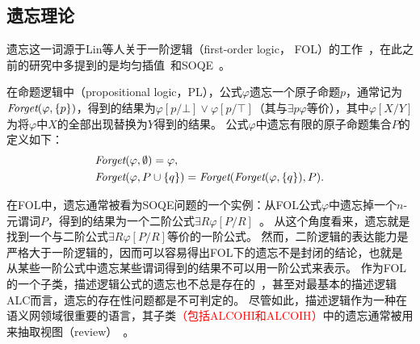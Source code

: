 \subsection{遗忘理论}\label{chapter01:forgetting}
遗忘这一词源于Lin等人关于一阶逻辑（first-order logic， FOL）的工作~\cite{lin1994forget}，在此之前的研究中多提到的是均匀插值~\cite{visser1996uniform,konev2009forgetting}和SOQE~\cite{ackermann1935untersuchungen}。

在命题逻辑中（propositional logic，PL），公式$\varphi$遗忘一个原子命题$p$，通常记为$\textit{Forget}(\varphi,\{p\})$，得到的结果为$\varphi[p/\bot] \vee \varphi[p/\top]$（其与$\exists p\varphi$等价），其中$\varphi[X/Y]$为将$\varphi$中$X$的全部出现替换为$Y$得到的结果。
公式$\varphi$中遗忘有限的原子命题集合$P$的定义如下：
\begin{alignat*}{2}
	&  \Forget(\varphi, \emptyset) = \varphi, \qquad \\ %
	&  \Forget(\varphi, P \cup \{q\})  = \Forget(\Forget(\varphi, \{q\}), P).
	\nonumber
\end{alignat*}

在FOL中，遗忘通常被看为SOQE问题的一个实例：从FOL公式$\varphi$中遗忘掉一个$n$-元谓词$P$，得到的结果为一个二阶公式$\exists R \varphi[P/R]$~\cite{lin1994forget}。
从这个角度看来，遗忘就是找到一个与二阶公式$\exists R \varphi[P/R]$等价的一阶公式。
然而，二阶逻辑的表达能力是严格大于一阶逻辑的，因而可以容易得出FOL下的遗忘不是封闭的结论，也就是从某些一阶公式中遗忘某些谓词得到的结果不可以用一阶公式来表示。
作为FOL的一个子类，描述逻辑公式的遗忘也不总是存在的~\cite{DBLP:journals/ai/KonevL0W13}，甚至对最基本的描述逻辑{\cal ALC}而言，遗忘的存在性问题都是不可判定的。
尽管如此，描述逻辑作为一种在语义网领域很重要的语言，其子类\textcolor{red}{（包括{\cal ALCOHI}和{\cal ALCOIH}）}中的遗忘通常被用来抽取视图（review）~\cite{Wang:AMAI:2010,DBLP:conf/ijcai/LutzW11,Konev:JAIR:2012,DBLP:conf/ijcai/ZhaoS17,DBLP:conf/aaai/ZhaoSWZF20}。

